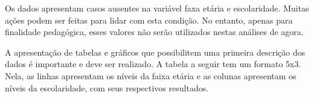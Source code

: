 \documentclass[
]{book}
\newenvironment{Shaded}{\begin{snugshade}}{\end{snugshade}}
\newcommand{\CommentTok}[1]{\textcolor[rgb]{0.56,0.35,0.01}{\textit{#1}}}
\newcommand{\DataTypeTok}[1]{\textcolor[rgb]{0.13,0.29,0.53}{#1}}
\newcommand{\KeywordTok}[1]{\textcolor[rgb]{0.13,0.29,0.53}{\textbf{#1}}}
\newcommand{\NormalTok}[1]{#1}
\newcommand{\OperatorTok}[1]{\textcolor[rgb]{0.81,0.36,0.00}{\textbf{#1}}}
\newcommand{\OtherTok}[1]{\textcolor[rgb]{0.56,0.35,0.01}{#1}}
\newcommand{\StringTok}[1]{\textcolor[rgb]{0.31,0.60,0.02}{#1}}
\begin{document}
\begin{Shaded}
\end{Shaded}

Os dados apresentam casos ausentes na variável faxa etária e escolaridade. Muitas ações podem ser feitas para lidar com esta condição. No entanto, apenas para finalidade pedagógica, esses valores não serão utilizados nestas análises de agora.

\begin{Shaded}
\end{Shaded}

A apresentação de tabelas e gráficos que possibilitem uma primeira descrição dos dados é importante e deve ser realizado. A tabela a seguir tem um formato 5x3. Nela, as linhas apresentam os níveis da faixa etária e as colunas apresentam os níveis da escolaridade, com seus respectivos resultados.

\begin{Shaded}
\end{Shaded}
\end{document}
